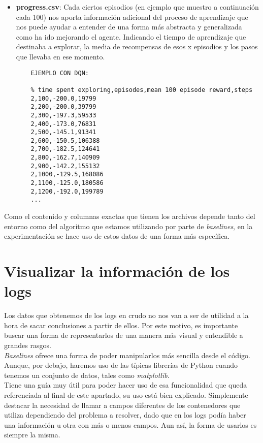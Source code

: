 \documentclass[11pt,fleqn]{book} %
\begin{document}
\begin{itemize}
	\item \textbf{progress.csv}: Cada ciertos episodios (en ejemplo que muestro a continuación cada 100) nos aporta información adicional del proceso de aprendizaje que nos puede ayudar a entender de una forma más abstracta y generalizada como ha ido mejorando el agente. Indicando el tiempo de aprendizaje que destinaba a explorar, la media de recompensas de esos x episodios y los pasos que llevaba en ese momento.\\
	
	
	\begin{verbatim}
	EJEMPLO CON DQN:
	
	% time spent exploring,episodes,mean 100 episode reward,steps
	2,100,-200.0,19799
	2,200,-200.0,39799
	2,300,-197.3,59533
	2,400,-173.0,76831
	2,500,-145.1,91341
	2,600,-150.5,106388
	2,700,-182.5,124641
	2,800,-162.7,140909
	2,900,-142.2,155132
	2,1000,-129.5,168086
	2,1100,-125.0,180586
	2,1200,-192.0,199789
	...
	\end{verbatim}
\end{itemize}

Como el contenido y columnas exactas que tienen los archivos depende tanto del entorno como del algoritmo que estamos utilizando por parte de \textit{baselines}, en la experimentación se hace uso de estos datos de una forma más específica.

\section{Visualizar la información de los logs}\label{sec:visualizarlogs}

Los datos que obtenemos de los logs en crudo no nos van a ser de utilidad a la hora de sacar conclusiones a partir de ellos. Por este motivo, es importante buscar una forma de representarlos de una manera más visual y entendible a grandes rasgos. \\

\textit{Baselines} ofrece una forma de poder manipularlos más sencilla desde el código. Aunque, por debajo, haremos uso de las típicas librerías de Python cuando tenemos un conjunto de datos, tales como \textit{matplotlib}. \\

Tiene una guía muy útil para poder hacer uso de esa funcionalidad que queda referenciada al final de este apartado, su uso está bien explicado. Simplemente destacar la necesidad de llamar a campos diferentes de los contenedores que utiliza dependiendo del problema a resolver, dado que en los logs podía haber una información u otra con más o menos campos. Aun así, la forma de usarlos es siempre la misma.\cite{article:plot} \\
\end{document}
